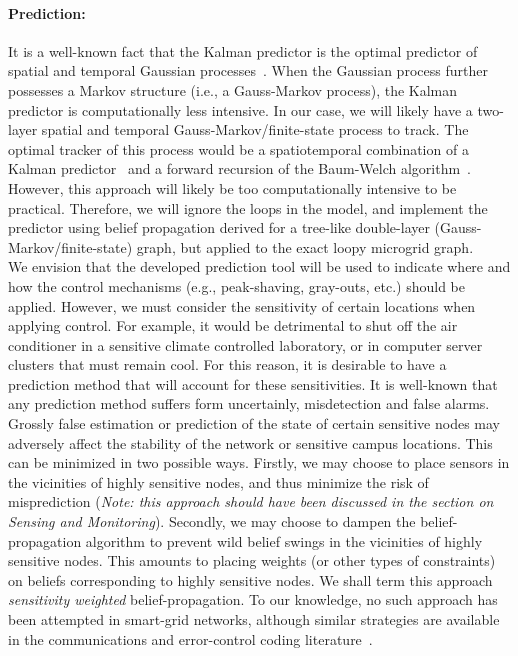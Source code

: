 \paragraph{Prediction:} It is a well-known fact that the Kalman
predictor is the optimal predictor of spatial and temporal Gaussian
processes~\cite{???}. When the Gaussian process further possesses a
Markov structure (i.e., a Gauss-Markov process), the Kalman
predictor is computationally less intensive. In our case, we will
likely have a two-layer spatial and temporal
Gauss-Markov/finite-state process to track. The optimal tracker of
this process would be a spatiotemporal combination of a Kalman
predictor~\cite{} and a forward recursion of the Baum-Welch
algorithm~\cite{}. However, this approach will likely be too
computationally intensive to be practical. Therefore, we will ignore
the loops in the model, and implement the predictor using belief
propagation derived for a tree-like double-layer
(Gauss-Markov/finite-state) graph, but applied to the exact loopy
microgrid graph. \\
\indent We envision that the developed prediction tool will be used
to indicate where and how the control mechanisms (e.g.,
peak-shaving, gray-outs, etc.) should be applied. However, we must
consider the sensitivity of certain locations when applying control.
For example, it would be detrimental to shut off the air conditioner
in a sensitive climate controlled laboratory, or in computer server
clusters that must remain cool. For this reason, it is desirable to
have a prediction method that will account for these sensitivities.
It is well-known that any prediction method suffers form
uncertainly, misdetection and false alarms. Grossly false estimation
or prediction of the state of certain sensitive nodes may adversely
affect the stability of the network or sensitive campus locations.
This can be minimized in two possible ways. Firstly, we may choose
to place sensors in the vicinities of highly sensitive nodes, and
thus minimize the risk of misprediction ({\em Note: this approach should
have been discussed in the section on Sensing and Monitoring}).
Secondly, we may choose to dampen the belief-propagation algorithm
to prevent wild belief swings in the vicinities of highly sensitive
nodes. This amounts to placing weights (or other types of
constraints) on beliefs corresponding to highly sensitive nodes. We
shall term this approach {\em sensitivity weighted}
belief-propagation. To our knowledge, no such approach has been
attempted in smart-grid networks, although similar strategies are
available in the communications and error-control coding
literature~\cite{}.

